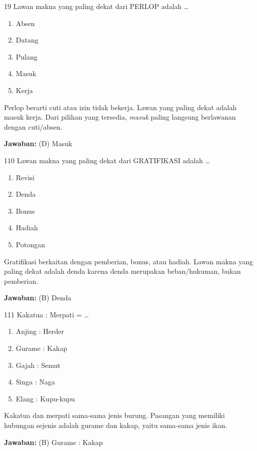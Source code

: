 \documentclass[11pt]{article}
\newenvironment{pil}{\begin{enumerate}[label=(\Alph*),leftmargin=*,itemsep=1pt,topsep=3pt]}{\end{enumerate}}
\newcommand{\jw}[1]{\par\smallskip\begin{jawbox}\textbf{Jawaban:} #1\end{jawbox}}
\begin{document}
\begin{soalbox}{1}{9}
Lawan makna yang paling dekat dari PERLOP adalah \ldots
\begin{pil}\item Absen \item Datang \item Pulang \item Masuk \item Kerja\end{pil}
\end{soalbox}
\begin{pembox}
Perlop berarti cuti atau izin tidak bekerja. Lawan yang paling dekat adalah masuk kerja. Dari pilihan yang tersedia, \emph{masuk} paling langsung berlawanan dengan cuti/absen.
\jw{(D) Masuk}
\end{pembox}

\begin{soalbox}{1}{10}
Lawan makna yang paling dekat dari GRATIFIKASI adalah \ldots
\begin{pil}\item Revisi \item Denda \item Bonus \item Hadiah \item Potongan\end{pil}
\end{soalbox}
\begin{pembox}
Gratifikasi berkaitan dengan pemberian, bonus, atau hadiah. Lawan makna yang paling dekat adalah denda karena denda merupakan beban/hukuman, bukan pemberian.
\jw{(B) Denda}
\end{pembox}

\begin{soalbox}{1}{11}
Kakatua : Merpati = \ldots
\begin{pil}\item Anjing : Herder \item Gurame : Kakap \item Gajah : Semut \item Singa : Naga \item Elang : Kupu-kupu\end{pil}
\end{soalbox}
\begin{pembox}
Kakatua dan merpati sama-sama jenis burung. Pasangan yang memiliki hubungan sejenis adalah gurame dan kakap, yaitu sama-sama jenis ikan.
\jw{(B) Gurame : Kakap}
\end{pembox}
\end{document}

